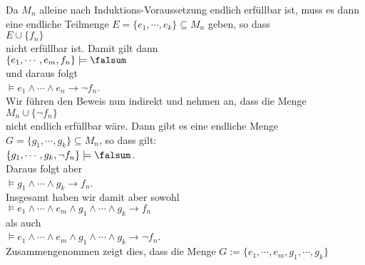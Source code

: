 \begin{enumerate}
\begin{enumerate}
        Da $M_n$ alleine nach Induktions-Voraussetzung endlich erf\"{u}llbar ist, muss es dann eine
        endliche Teilmenge $E = \{ e_1, \cdots, e_k \} \subseteq M_n$ geben, so dass
        \\[0.2cm]
        \hspace*{1.3cm}
        $E \cup \{ f_n \}$
        \\[0.2cm]
        nicht erf\"{u}llbar ist.  Damit gilt dann
        \\[0.2cm]
        \hspace*{1.3cm}
        $\{ e_1, \cdots, e_m, f_n \} \models \falsum$
        \\[0.2cm]
        und daraus folgt
        \\[0.2cm]
        \hspace*{1.3cm}
        $ \models e_1 \wedge \cdots \wedge e_n \rightarrow \neg f_n$.
        \\[0.2cm]
        Wir f\"{u}hren den Beweis nun indirekt und nehmen an, dass die Menge
        \\[0.2cm]
        \hspace*{1.3cm}
        $M_n \cup \{ \neg f_n \}$ 
        \\[0.2cm]
        nicht endlich erf\"{u}llbar w\"{a}re.  Dann gibt es eine endliche Menge 
        $G = \{ g_1, \cdots, g_k \} \subseteq M_n$,
        so dass gilt:
        \\[0.2cm]
        \hspace*{1.3cm}
        $\{ g_1, \cdots, g_k, \neg f_n \} \models \falsum$.
        \\[0.2cm]
        Daraus folgt aber
        \\[0.2cm]
        \hspace*{1.3cm}
        $\models g_1 \wedge \cdots \wedge g_k \rightarrow f_n$.
        \\[0.2cm]
        Insgesamt haben wir damit aber sowohl
        \\[0.2cm]
        \hspace*{1.3cm}
        $\models e_1 \wedge \cdots \wedge e_m \wedge g_1 \wedge \cdots \wedge g_k \rightarrow f_n$
        \\
        als auch 
        \\[-0.2cm]
        \hspace*{1.3cm}
        $\models e_1 \wedge \cdots \wedge e_m \wedge g_1 \wedge \cdots \wedge g_k \rightarrow \neg f_n$.
        \\[0.2cm]
        Zusammengenommen zeigt dies, dass die Menge $G := \{ e_1, \cdots, e_m, g_1, \cdots, g_k \}$

\end{enumerate}
\end{enumerate}
